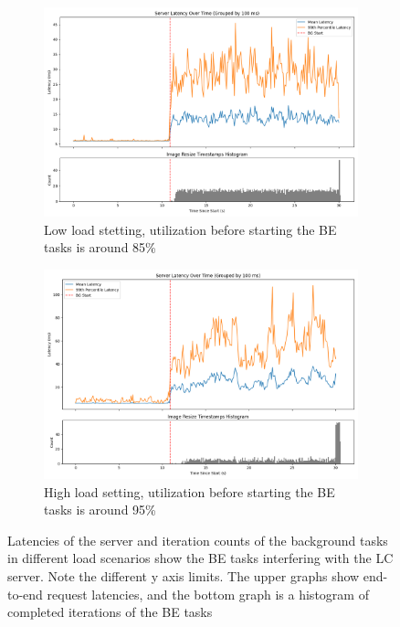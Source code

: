 \begin{figure}[t]
    \centering
    \begin{subfigure}{\columnwidth}
        \includegraphics[width=\columnwidth]{graphs/srv-bg-weight-150-low.png}
        \caption{Low load stetting, utilization before starting the BE tasks is
        around 85\%}\label{fig:srv-bg-weight-150-low}
        \vspace{12pt}
    \end{subfigure}
    \hspace{\fill}
    \begin{subfigure}{\columnwidth}
        \includegraphics[width=\columnwidth]{graphs/srv-bg-weight-150-high.png}
        \caption{High load setting, utilization before starting the BE tasks is
        around 95\%}\label{fig:srv-bg-weight-150-high}
    \end{subfigure}
    \vspace{4pt}
    \caption{Latencies of the server and iteration counts of the background
    tasks in different load scenarios show the BE tasks interfering with the LC
    server. Note the different y axis limits. The upper graphs show end-to-end
    request latencies, and the bottom graph is a histogram of completed
    iterations of the BE tasks}\label{fig:srv-bg-weight-150}
\end{figure}

